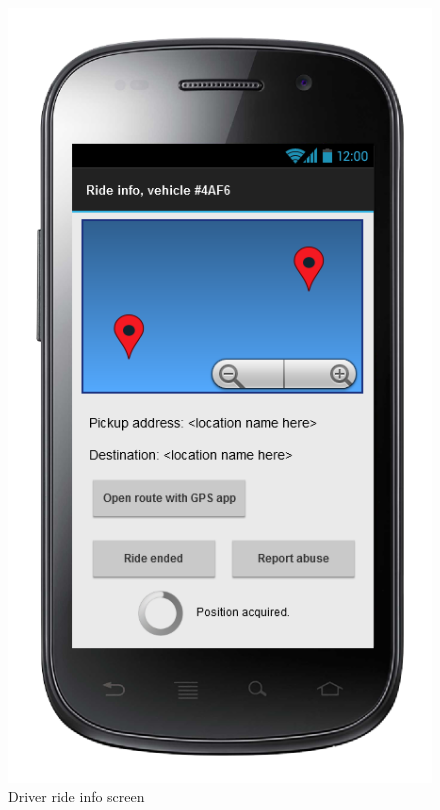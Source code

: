 \begin{figure} [h]
\centering
  	  \includegraphics[scale=0.5]{ui/Driver ride info screen.png}
\caption{Driver ride info screen}
  
	\end{figure}

